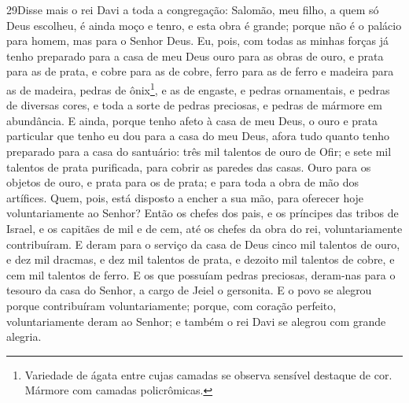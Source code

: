 \lettrine{29} Disse mais o rei Davi a toda a congregação:
Salomão, meu filho, a quem só Deus escolheu, é ainda moço e tenro, e
esta obra é grande; porque não é o palácio para homem, mas para o
Senhor Deus. Eu, pois, com todas as minhas forças já tenho
preparado para a casa de meu Deus ouro para as obras de ouro, e
prata para as de prata, e cobre para as de cobre, ferro para as de
ferro e madeira para as de madeira, pedras de
ônix\footnote{Variedade de ágata entre cujas camadas se observa
sensível destaque de cor. Mármore com camadas policrômicas.}, e as
de engaste, e pedras ornamentais, e pedras de diversas cores, e toda
a sorte de pedras preciosas, e pedras de mármore em abundância.
E ainda, porque tenho afeto à casa de meu Deus, o ouro e prata
particular que tenho eu dou para a casa do meu Deus, afora tudo
quanto tenho preparado para a casa do santuário: três mil
talentos de ouro de Ofir; e sete mil talentos de prata purificada,
para cobrir as paredes das casas. Ouro para os objetos de ouro,
e prata para os de prata; e para toda a obra de mão dos artífices.
Quem, pois, está disposto a encher a sua mão, para oferecer hoje
voluntariamente ao Senhor? Então os chefes dos pais, e os
príncipes das tribos de Israel, e os capitães de mil e de cem, até
os chefes da obra do rei, voluntariamente contribuíram. E deram
para o serviço da casa de Deus cinco mil talentos de ouro, e dez mil
dracmas, e dez mil talentos de prata, e dezoito mil talentos de
cobre, e cem mil talentos de ferro. E os que possuíam pedras
preciosas, deram-nas para o tesouro da casa do Senhor, a cargo de
Jeiel o gersonita. E o povo se alegrou porque contribuíram
voluntariamente; porque, com coração perfeito, voluntariamente deram
ao Senhor; e também o rei Davi se alegrou com grande alegria.

